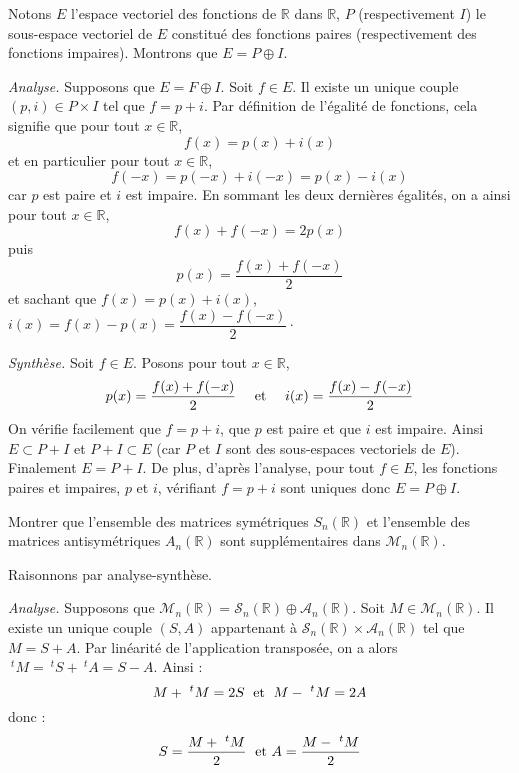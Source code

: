\documentclass[a4paper,10pt]{report}
\begin{document}
\corr Notons $E$ l'espace vectoriel des fonctions de $\mathbb{R}$ dans $\mathbb{R}$, $P$ (respectivement $I$) le sous-espace vectoriel de $E$ constitué des fonctions paires (respectivement des fonctions impaires). Montrons que $E= P \oplus I$.

\medskip

\noindent \textit{Analyse.} Supposons que $E= F \oplus I$. Soit $f \in E$. Il existe un unique couple $(p,i) \in P \times I$ tel que $f=p + i$. Par définition de l'égalité de fonctions, cela signifie que pour tout $x \in \mathbb{R}$,
$$ f(x) = p(x)+i(x)$$
et en particulier pour tout $x \in \mathbb{R}$,
$$ f(-x) = p(-x)+i(-x) = p(x)-i(x)$$
car $p$ est paire et $i$ est impaire. En sommant les deux dernières égalités, on a ainsi pour tout $x \in \mathbb{R}$,
$$ f(x)+f(-x) = 2p(x) $$
puis
$$ p(x) = \frac{f(x)+f(-x)}{2}$$
et sachant que $f(x)=p(x)+i(x)$, $i(x)=f(x)-p(x) = \dfrac{f(x)-f(-x)}{2}\cdot$

\medskip

\noindent \textit{Synthèse.} Soit $f \in E$. Posons pour tout $x \in \mathbb{R}$,
$$ p(x) = \frac{f(x)+f(-x)}{2} \quad \hbox{ et } \quad i(x) = \frac{f(x)-f(-x)}{2} $$
On vérifie facilement que $f=p+i$, que $p$ est paire et que $i$ est impaire. Ainsi $E \subset P + I$ et $P + I \subset E$ (car $P$ et $I$ sont des sous-espaces vectoriels de $E$). Finalement $E=P+I$. De plus, d'après l'analyse, pour tout $f \in E$, les fonctions paires et impaires, $p$ et $i$, vérifiant $f=p+i$ sont uniques donc $E = P \oplus I$.

\medskip

\begin{Exa} Montrer que l'ensemble des matrices symétriques $S_n(\mathbb{R})$ et l'ensemble des matrices antisymétriques $A_n(\mathbb{R})$ sont supplémentaires dans $\mathcal{M}_n(\mathbb{R})$.
\end{Exa}

\corr Raisonnons par analyse-synthèse.

\medskip

\noindent \textit{Analyse.} Supposons que $\mathcal{M}_n(\mathbb{R})= \mathcal{S}_n(\mathbb{R}) \oplus \mathcal{A}_n(\mathbb{R})$. Soit $M \in \mathcal{M}_n(\mathbb{R})$. Il existe un unique couple $(S,A)$ appartenant à  $\mathcal{S}_n(\mathbb{R}) \times \mathcal{A}_n(\mathbb{R})$ tel que $M=S+A$. Par linéarité de l'application transposée, on a alors $~^t M = ~^t S + ~^t A = S-A$. Ainsi :
$$ M + ~^t M = 2S \; \hbox{ et } \; M- ~^tM= 2A$$
donc :
$$ S = \dfrac{M + ~^t M}{2} \; \hbox{ et } A = \dfrac{M-~^tM}{2}$$
\end{document}

